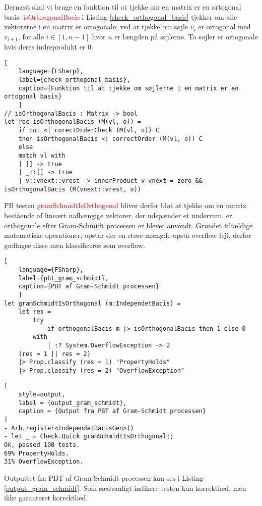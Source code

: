 Dernæst skal vi bruge en funktion til at tjekke om en matrix er en ortogonal basis. \textcolor{red}{isOrthogonalBacis} i Listing \ref{check_orthogonal_basis} tjekker om alle vektorerne i en matrix er ortogonale, ved at tjekke om søjle $v_i$ er ortogonal med $v_{i+1}$, for alle $i \in [1, n-1]$ hvor $n$ er længden på søjlerne. To søjler er ortogonale hvis deres indreprodukt er 0.

\begin{lstlisting}[
    language={FSharp}, 
    label={check_orthogonal_basis}, 
    caption={Funktion til at tjekke om søjlerne i en matrix er en ortogonal basis}
    ]
// isOrthogonalBacis : Matrix -> bool
let rec isOrthogonalBacis (M(vl, o)) =
    if not <| corectOrderCheck (M(vl, o)) C 
    then isOrthogonalBacis <| correctOrder (M(vl, o)) C
    else
    match vl with
    | [] -> true
    | _::[] -> true
    | v::vnext::vrest -> innerProduct v vnext = zero && isOrthogonalBacis (M(vnext::vrest, o))
\end{lstlisting}

PB testen \textcolor{red}{gramSchmidtIsOrthogonal} bliver derfor blot at tjekke om en matrix bestående af lineært uafhængige vektorer, der udspænder et underrum, er orthogonale efter Gram-Schmidt processen er blevet anvendt. Grundet tilfældige matematiske operationer, opstår der en støre mængde opstå overflow fejl, derfor godtages disse men klassificeres som overflow.

\begin{lstlisting}[
    language={FSharp}, 
    label={pbt_gram_schmidt}, 
    caption={PBT af Gram-Schmidt processen}
    ]
let gramSchmidtIsOrthogonal (m:IndependetBacis) =
    let res =
        try 
            if orthogonalBacis m |> isOrthogonalBacis then 1 else 0
        with
            | :? System.OverflowException -> 2
    (res = 1 || res = 2)
    |> Prop.classify (res = 1) "PropertyHolds"
    |> Prop.classify (res = 2) "OverflowException"
\end{lstlisting}

\begin{lstlisting}[
    style=output,
    label = {output_gram_schmidt},
    caption = {Output fra PBT af Gram-Schmidt processen}
]
- Arb.register<IndependetBacisGen>()
- let _ = Check.Quick gramSchmidtIsOrthogonal;;
Ok, passed 100 tests.
69% PropertyHolds.
31% OverflowException.
\end{lstlisting}

Outputtet fra PBT af Gram-Schmidt processen kan ses i Listing \ref{output_gram_schmidt}. Som sædvanligt indikere testen kun korrekthed, men ikke garanteret korrekthed.
